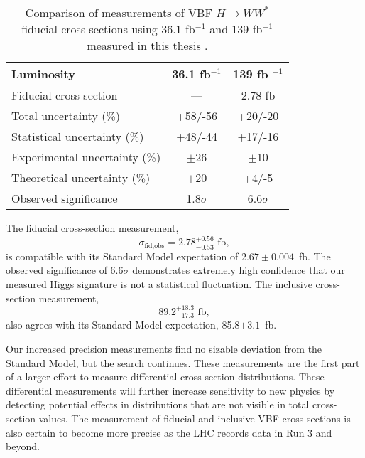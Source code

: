 \begin{table}[!h]
  \begin{center}
    \begin{tabular}{|l|c|c|}
       \hline
        Luminosity & 36.1 fb$^{-1}$    & 139 fb $^{-1}$ \\
      \hline
	Fiducial cross-section & --- & 2.78 fb \\ 
	Total uncertainty (\%) & +58/-56 & +20/-20 \\
	Statistical uncertainty (\%) & +48/-44 & +17/-16 \\
        Experimental uncertainty (\%) & $\pm$26 & $\pm$10 \\
        Theoretical uncertainty (\%) & $\pm$20 & +4/-5 \\
        Observed significance & 1.8$\sigma$& 6.6$\sigma$ \\
	\hline 
    \end{tabular}
    \caption{Comparison of measurements of VBF $H\rightarrow WW^*$ fiducial cross-sections using 36.1 fb$^{-1}$ and 139 fb$^{-1}$ measured in this thesis \cite{HWW2016}.}
    \label{tab:comparison}
  \end{center}
\end{table}

The fiducial cross-section measurement, 
\begin{equation}
\sigma_{\text{fid,obs}} = 2.78^{+0.56}_{-0.53} \text{ fb},
\end{equation}
is compatible with its Standard Model expectation of $2.67\pm0.004$~fb. The observed significance of $6.6\sigma$ demonstrates extremely high confidence that our measured Higgs signature is not a statistical fluctuation. The inclusive cross-section measurement,
\begin{equation}
89.2^{+18.3}_{-17.3} \text{ fb},
\end{equation}
also agrees with its Standard Model expectation, 85.8$\pm 3.1$~fb. 

Our increased precision measurements find no sizable deviation from the Standard Model, but the search continues. These measurements are the first part of a larger effort to measure differential cross-section distributions. These differential measurements will further increase sensitivity to new physics by detecting potential effects in distributions that are not visible in total cross-section values. The measurement of fiducial and inclusive VBF cross-sections is also certain to become more precise as the LHC records data in Run 3 and beyond. 
